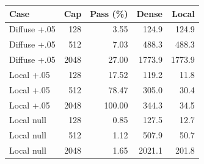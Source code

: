 \begin{tabular}{lrrrr}
\toprule
Case & Cap & Pass (\%) & Dense & Local \\
\midrule
Diffuse +.05 & 128 & 3.55 & 124.9 & 124.9 \\
Diffuse +.05 & 512 & 7.03 & 488.3 & 488.3 \\
Diffuse +.05 & 2048 & 27.00 & 1773.9 & 1773.9 \\
Local +.05 & 128 & 17.52 & 119.2 & 11.8 \\
Local +.05 & 512 & 78.47 & 305.0 & 30.4 \\
Local +.05 & 2048 & 100.00 & 344.3 & 34.5 \\
Local null & 128 & 0.85 & 127.5 & 12.7 \\
Local null & 512 & 1.12 & 507.9 & 50.7 \\
Local null & 2048 & 1.65 & 2021.1 & 201.8 \\
\bottomrule
\end{tabular}
